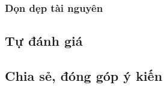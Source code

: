 \subsubsection{Dọn dẹp tài nguyên}


\newpage

\subsection{Tự đánh giá}



\newpage

\subsection{Chia sẻ, đóng góp ý kiến}



\newpage

